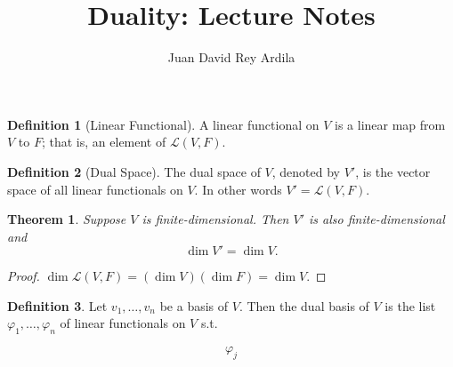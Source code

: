\documentclass[a4paper,10pt]{article}
\title{Duality: Lecture Notes}
\author{Juan David Rey Ardila}
\date{}
\theoremstyle{plain}             %
\newtheorem{theorem}{Theorem}[section]
\theoremstyle{definition}        %
\newtheorem{definition}{Definition}[section]
\begin{document}
\maketitle


\begin{definition}[Linear Functional]
    A linear functional on $V$ is a linear map from $V$ to $F$; that is,
    an element of $\mathcal{L}(V, F)$.
\end{definition}


\begin{definition}[Dual Space]
    The dual space of $V$, denoted by $V'$, is the vector space of all linear 
    functionals on $V$. In other words $V' = \mathcal{L}(V, F)$. 
\end{definition}


\begin{theorem}
    Suppose $V$ is finite-dimensional. Then $V'$ is also finite-dimensional and
    \begin{equation*}
        \dim V' = \dim V.
    \end{equation*}
\end{theorem}

\begin{proof}
    $\dim \mathcal{L}(V, F) = (\dim V)(\dim F) = \dim V$.
\end{proof}


\begin{definition}
    Let $v_1, \ldots, v_n$ be a basis of $V$. Then the dual basis of $V$ is 
    the list $\varphi_1, \ldots, \varphi_n$ of linear functionals on $V$ s.t.

    \begin{equation*}
        \varphi_j
    \end{equation*}
\end{definition}
\end{document}
